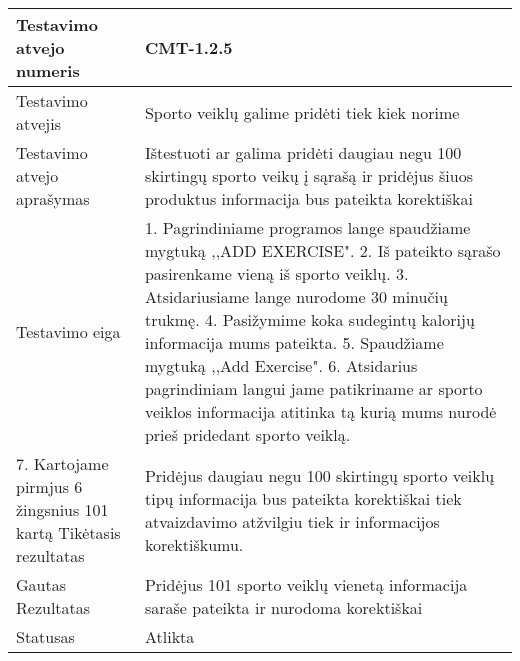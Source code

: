 \documentclass[oneside]{VUMIFPSkursinis}
\begin{document}
\begin{center}
    \begin{tabular}{ |p{5cm}|p{13cm}|}
    \hline
        Testavimo atvejo numeris & CMT-1.2.5  \\ \hline
        Testavimo atvejis & Sporto veiklų galime pridėti tiek kiek norime  \\ \hline
        Testavimo atvejo aprašymas & Ištestuoti ar galima pridėti daugiau negu 100 skirtingų sporto veikų į sąrašą ir pridėjus šiuos produktus informacija bus pateikta korektiškai \\ \hline
        Testavimo eiga &  1. Pagrindiniame programos lange spaudžiame mygtuką ,,ADD EXERCISE". 
				2. Iš pateikto sąrašo pasirenkame vieną iš sporto veiklų. 
				3. Atsidariusiame lange nurodome 30 minučių trukmę.
				4. Pasižymime koka sudegintų kalorijų informacija mums pateikta. 
				5. Spaudžiame mygtuką ,,Add Exercise".
				6. Atsidarius pagrindiniam langui jame patikriname ar sporto veiklos informacija atitinka tą kurią mums nurodė prieš pridedant sporto veiklą.\\ \hline
				7. Kartojame pirmjus 6 žingsnius 101 kartą
        Tikėtasis rezultatas & Pridėjus daugiau negu 100 skirtingų sporto veiklų tipų informacija bus pateikta korektiškai tiek atvaizdavimo atžvilgiu tiek ir informacijos korektiškumu.\\ \hline
        Gautas Rezultatas & Pridėjus 101 sporto veiklų vienetą informacija saraše pateikta ir nurodoma korektiškai  \\ \hline
        Statusas & Atlikta  \\ \hline
    \hline
    \end{tabular}
\end{center}
\end{document}
